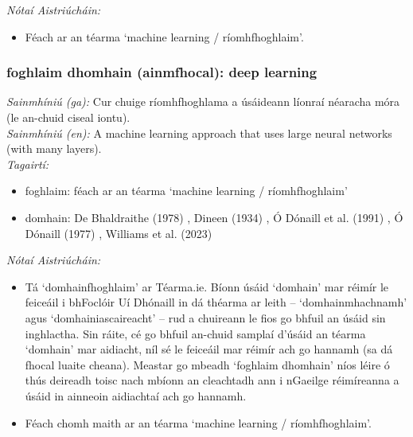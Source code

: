 \documentclass{article}
\begin{document}
 \noindent \textit{Nótaí Aistriúcháin:}
\begin{itemize}
	\item Féach ar an téarma `machine learning / ríomhfhoghlaim'.
\end{itemize}


\subsubsection*{foghlaim dhomhain (ainmfhocal): deep learning}
 \noindent \textit{Sainmhíniú (ga):} Cur chuige ríomhfhoghlama a úsáideann líonraí néaracha móra (le an-chuid ciseal iontu).
\\
 \noindent \textit{Sainmhíniú (en):} A machine learning approach that uses large neural networks (with many layers).
\\
 \noindent \textit{Tagairtí:}
\begin{itemize}
	\item foghlaim: féach ar an téarma `machine learning / ríomhfhoghlaim'
	\item domhain: De Bhaldraithe (1978) \cite{de-bhaldraithe}, Dineen (1934) \cite{dineen}, Ó Dónaill et al. (1991) \cite{focloir-beag}, Ó Dónaill (1977) \cite{odonaill}, Williams et al. (2023) \cite{storchiste}
\end{itemize}

 \noindent \textit{Nótaí Aistriúcháin:}
\begin{itemize}
	\item Tá `domhainfhoghlaim' ar Téarma.ie. Bíonn úsáid `domhain' mar réimír le feiceáil i bhFoclóir Uí Dhónaill in dá théarma ar leith -- `domhainmhachnamh' agus `domhainiascaireacht' -- rud a chuireann le fios go bhfuil an úsáid sin inghlactha. Sin ráite, cé go bhfuil an-chuid samplaí d'úsáid an téarma `domhain' mar aidiacht, níl sé le feiceáil mar réimír ach go hannamh (sa dá fhocal luaite cheana). Meastar go mbeadh `foghlaim dhomhain' níos léire ó thús deireadh toisc nach mbíonn an cleachtadh ann i nGaeilge réimíreanna a úsáid in ainneoin aidiachtaí ach go hannamh.
	\item Féach chomh maith ar an téarma `machine learning / ríomhfhoghlaim'.
\end{itemize}
\end{document}
